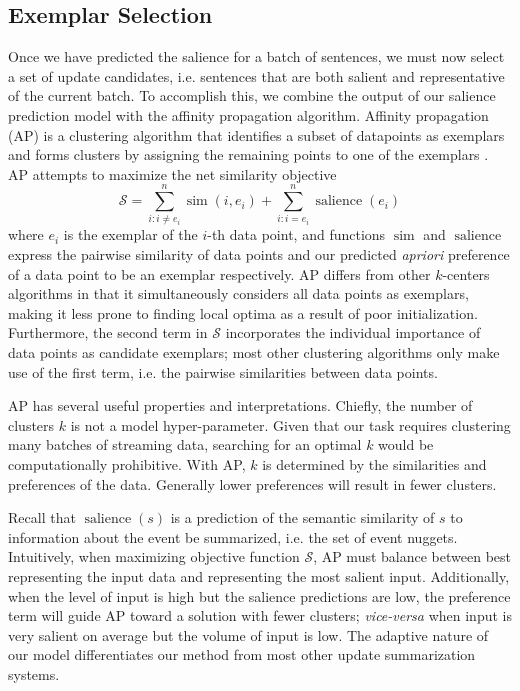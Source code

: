 \subsection{Exemplar Selection}
\label{sec:exsel}

Once we have predicted the salience for a batch of sentences, we must
now select a set of update candidates, i.e. sentences that are both salient
and representative of the current batch.
To accomplish this, we combine the output of our 
salience prediction model with the affinity
propagation algorithm.
Affinity propagation (AP) is a clustering algorithm
that identifies a subset of datapoints as exemplars and forms clusters
by assigning the remaining points to one of the exemplars 
\cite{frey2007clustering}. AP attempts to 
maximize the net similarity objective 
\[ \mathcal{S} = \sum_{i : i \neq e_i}^n \operatorname{sim}(i,e_i) 
+ \sum_{i : i = e_i}^n \operatorname{salience}(e_i)  \]
where $e_i$ is the exemplar of the $i$-th data point, and functions
$\operatorname{sim}$ and $\operatorname{salience}$ express the pairwise 
similarity
of data points and our predicted \textit{apriori} preference of a data point to be an exemplar
respectively. 
AP differs from other $k$-centers algorithms in that it simultaneously 
considers all data points as exemplars, making it less prone to finding
local optima as a result of poor initialization. Furthermore, the 
second term in $\mathcal{S}$ incorporates the individual importance of 
data points as candidate exemplars; most other clustering algorithms only make
use of the first term, i.e. the pairwise similarities between data points.
 

AP has several useful properties and interpretations. Chiefly, the number
of clusters $k$ is not a model hyper-parameter. Given that our task requires
clustering many batches of streaming data, searching for an optimal $k$ 
would be computationally prohibitive. With AP, $k$ is determined by the
similarities and preferences of the data. Generally lower preferences will
result in fewer clusters.  


Recall that $\operatorname{salience}(s)$
is a prediction of the semantic similarity of $s$ to information about the 
event be summarized, i.e. the set of event nuggets.
Intuitively, when maximizing objective function $\mathcal{S}$, AP must balance
between best representing the input data and representing the most salient
input. Additionally, when the level of input is high but the salience
predictions are low, the preference term will guide AP toward a solution
with fewer clusters; \textit{vice-versa} when input is very salient on average but
the volume of input is low. The adaptive nature of our model differentiates
our method from most other update summarization systems.




